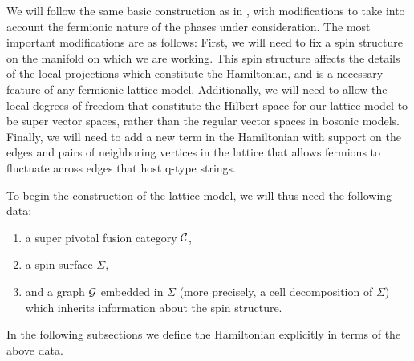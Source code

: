 We will follow the same basic construction as in \cite{levin2005}, with modifications to take into account 
the fermionic nature of the phases under consideration. 
The most important modifications are as follows:
First, we will need to fix a spin structure on the manifold on which we are working.
This spin structure affects the details of the local projections which constitute the Hamiltonian, and is a necessary feature of any fermionic lattice model.
Additionally, we will need to allow the local degrees of freedom that constitute the 
Hilbert space for our lattice model to be super vector spaces, rather than the regular vector spaces in bosonic models. 
Finally, we will need to add a new term in the Hamiltonian with support on the edges and pairs of neighboring vertices in the lattice that allows fermions to fluctuate across edges 
that host q-type strings.

To begin the construction of the lattice model, we will thus need the following data:
\begin{enumerate}
\item a super pivotal fusion category ${\cal C}$,
\item a spin surface $\Sigma$,
\item and a graph $\mathcal{G}$ embedded in $\Sigma$ (more precisely, a cell decomposition of $\Sigma$) which inherits information about the spin structure.
\end{enumerate}
In the following subsections we define the Hamiltonian explicitly in terms of the above data.

